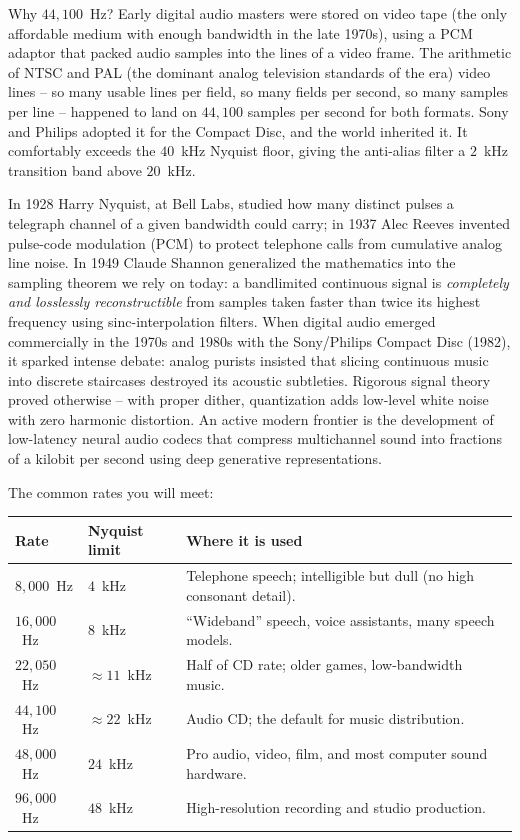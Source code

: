 \begin{whybox}
Why $44{,}100$~Hz? Early digital audio masters were stored
on video tape (the only affordable medium with enough bandwidth in the late 1970s), using a PCM
adaptor that packed audio samples into the lines of a video frame. The arithmetic of NTSC and PAL
(the dominant analog television standards of the era) video lines -- so many usable lines per field, so many fields per second, so many samples per
line -- happened to land on $44{,}100$ samples per second for both formats. Sony and Philips
adopted it for the Compact Disc, and the world inherited it. It comfortably exceeds the
$40$~kHz Nyquist floor, giving the anti-alias filter a $2$~kHz transition band above $20$~kHz.
\end{whybox}

\begin{historybox}
In 1928 Harry Nyquist, at Bell Labs, studied how many distinct
pulses a telegraph channel of a given bandwidth could carry; in 1937 Alec Reeves invented
pulse-code modulation (PCM) to protect telephone calls from cumulative analog line noise. In
1949 Claude Shannon generalized the mathematics into the sampling theorem we rely on today:
a bandlimited continuous signal is \emph{completely and losslessly reconstructible} from samples
taken faster than twice its highest frequency using sinc-interpolation filters. When digital
audio emerged commercially in the 1970s and 1980s with the Sony/Philips Compact Disc (1982),
it sparked intense debate: analog purists insisted that slicing continuous music into discrete
staircases destroyed its acoustic subtleties. Rigorous signal theory proved otherwise -- with
proper dither, quantization adds low-level white noise with zero harmonic distortion.
An active modern frontier is the development of low-latency neural audio codecs that compress
multichannel sound into fractions of a kilobit per second using deep generative representations.
\end{historybox}

The common rates you will meet:

\begin{center}
\begin{tabular}{@{}llp{8.2cm}@{}}
\toprule
Rate & Nyquist limit & Where it is used \\
\midrule
$8{,}000$~Hz   & $4$~kHz   & Telephone speech; intelligible but dull (no high consonant detail).\\
$16{,}000$~Hz  & $8$~kHz   & ``Wideband'' speech, voice assistants, many speech models.\\
$22{,}050$~Hz  & $\approx 11$~kHz & Half of CD rate; older games, low-bandwidth music.\\
$44{,}100$~Hz  & $\approx 22$~kHz & Audio CD; the default for music distribution.\\
$48{,}000$~Hz  & $24$~kHz  & Pro audio, video, film, and most computer sound hardware.\\
$96{,}000$~Hz  & $48$~kHz  & High-resolution recording and studio production.\\
\bottomrule
\end{tabular}
\end{center}

